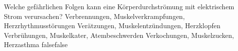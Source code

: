     {Welche gefährlichen Folgen kann eine Körperdurchströmung mit elektrischem Strom verursachen?}
    {Verbrennungen, Muskelverkrampfungen, Herzrhythmusstörungen}
    {Verätzungen, Muskelentzündungen, Herzklopfen}
    {Verbrühungen, Muskelkater, Atembeschwerden}
    {Verkochungen, Muskelzucken, Herzasthma}
    {false}{false}